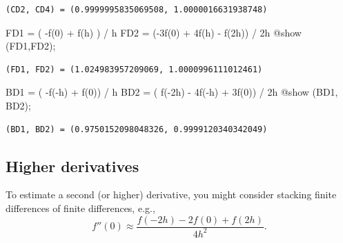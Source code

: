 \documentclass[
]{article}
\newenvironment{Shaded}{\begin{snugshade}}{\end{snugshade}}
\newcommand{\FloatTok}[1]{\textcolor[rgb]{0.68,0.00,0.00}{#1}}
\newcommand{\FunctionTok}[1]{\textcolor[rgb]{0.28,0.35,0.67}{#1}}
\newcommand{\NormalTok}[1]{\textcolor[rgb]{0.00,0.23,0.31}{#1}}
\newcommand{\OperatorTok}[1]{\textcolor[rgb]{0.37,0.37,0.37}{#1}}
\newcommand{\PreprocessorTok}[1]{\textcolor[rgb]{0.68,0.00,0.00}{#1}}
\begin{document}
\begin{verbatim}
(CD2, CD4) = (0.9999995835069508, 1.0000016631938748)
\end{verbatim}

\begin{Shaded}
\begin{Highlighting}[]
\NormalTok{FD1 }\OperatorTok{=}\NormalTok{ ( }\FunctionTok{{-}f}\NormalTok{(}\FloatTok{0}\NormalTok{)   }\OperatorTok{+}   \FunctionTok{f}\NormalTok{(h)        ) }\OperatorTok{/}\NormalTok{ h}
\NormalTok{FD2 }\OperatorTok{=}\NormalTok{ (}\FunctionTok{{-}3f}\NormalTok{(}\FloatTok{0}\NormalTok{)   }\OperatorTok{+}  \FloatTok{4}\FunctionTok{f}\NormalTok{(h) }\OperatorTok{{-}} \FunctionTok{f}\NormalTok{(}\FloatTok{2}\NormalTok{h)) }\OperatorTok{/} \FloatTok{2}\NormalTok{h }
\PreprocessorTok{@show}\NormalTok{ (FD1,FD2);}
\end{Highlighting}
\end{Shaded}

\begin{verbatim}
(FD1, FD2) = (1.024983957209069, 1.0000996111012461)
\end{verbatim}

\begin{Shaded}
\begin{Highlighting}[]
\NormalTok{BD1 }\OperatorTok{=}\NormalTok{ (          }\FunctionTok{{-}f}\NormalTok{(}\OperatorTok{{-}}\NormalTok{h) }\OperatorTok{+}  \FunctionTok{f}\NormalTok{(}\FloatTok{0}\NormalTok{)) }\OperatorTok{/}\NormalTok{ h}
\NormalTok{BD2 }\OperatorTok{=}\NormalTok{ ( }\FunctionTok{f}\NormalTok{(}\OperatorTok{{-}}\FloatTok{2}\NormalTok{h) }\OperatorTok{{-}} \FloatTok{4}\FunctionTok{f}\NormalTok{(}\OperatorTok{{-}}\NormalTok{h) }\OperatorTok{+} \FloatTok{3}\FunctionTok{f}\NormalTok{(}\FloatTok{0}\NormalTok{)) }\OperatorTok{/} \FloatTok{2}\NormalTok{h }
\PreprocessorTok{@show}\NormalTok{ (BD1, BD2);}
\end{Highlighting}
\end{Shaded}

\begin{verbatim}
(BD1, BD2) = (0.9750152098048326, 0.9999120340342049)
\end{verbatim}

\subsection{Higher derivatives}\label{higher-derivatives}

To estimate a second (or higher) derivative, you might consider stacking
finite differences of finite differences, e.g.,
\[f''(0) \approx \frac{f(-2h) - 2f(0) + f(2h)}{4h^2}.\]
\end{document}
